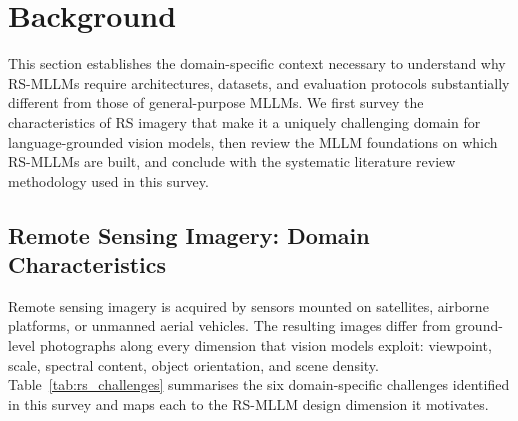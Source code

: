 
\section{Background}\label{sec2}

This section establishes the domain-specific context necessary to understand
why RS-MLLMs require architectures, datasets, and evaluation protocols
substantially different from those of general-purpose MLLMs. We first survey
the characteristics of RS imagery that make it a uniquely challenging domain
for language-grounded vision models, then review the MLLM foundations on which
RS-MLLMs are built, and conclude with the systematic literature review
methodology used in this survey.

\subsection{Remote Sensing Imagery: Domain Characteristics}\label{sec2:rs}

Remote sensing imagery is acquired by sensors mounted on satellites, airborne
platforms, or unmanned aerial vehicles. The resulting images differ from
ground-level photographs along every dimension that vision models exploit:
viewpoint, scale, spectral content, object orientation, and scene density.
Table~\ref{tab:rs_challenges} summarises the six domain-specific challenges
identified in this survey and maps each to the RS-MLLM design dimension it
motivates.


